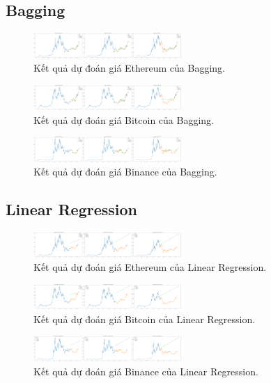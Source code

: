 \documentclass{ieeeojies}
\begin{document}
\subsection{Bagging}
\begin{figure}[h]
    \centering
    \includegraphics[width=0.5\textwidth]{bibliography/pictures/Bagging_ETH.png}
    \caption{Kết quả dự đoán giá Ethereum của Bagging.}
\end{figure}
\begin{figure}[h]
    \centering
    \includegraphics[width=0.5\textwidth]{bibliography/pictures/Bagging_BTC.png}
    \caption{Kết quả dự đoán giá Bitcoin của Bagging.}
\end{figure}
\begin{figure}[h]
    \centering
    \includegraphics[width=0.5\textwidth]{bibliography/pictures/Bagging_BNB.png}
    \caption{Kết quả dự đoán giá Binance của Bagging.}
\end{figure}
\subsection{Linear Regression}
\begin{figure}[h]
    \centering
    \includegraphics[width=0.5\textwidth]{bibliography/pictures/LinearRegression_ETH.png}
    \caption{Kết quả dự đoán giá Ethereum của Linear Regression.}
\end{figure}
\begin{figure}[h]
    \centering
    \includegraphics[width=0.5\textwidth]{bibliography/pictures/LinearRegression_BTC.png}
    \caption{Kết quả dự đoán giá Bitcoin của Linear Regression.}
\end{figure}
\begin{figure}[h]
    \centering
    \includegraphics[width=0.5\textwidth]{bibliography/pictures/LinearRegression_BNB.png}
    \caption{Kết quả dự đoán giá Binance của Linear Regression.}
\end{figure}
\end{document}

